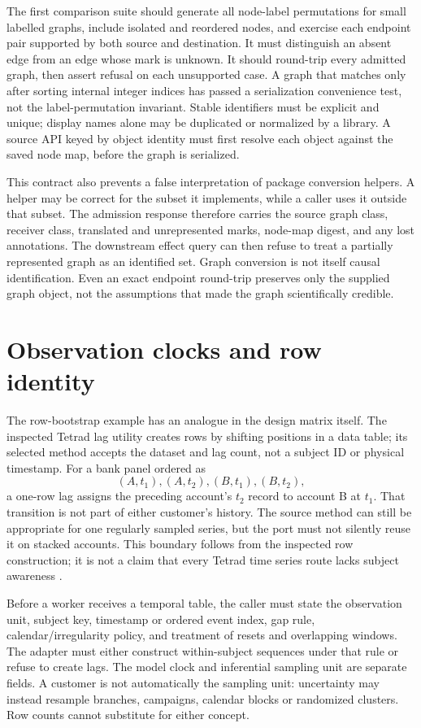 The first comparison suite should generate all node-label permutations for
small labelled graphs, include isolated and reordered nodes, and exercise each
endpoint pair supported by both source and destination. It must distinguish
an absent edge from an edge whose mark is unknown. It should round-trip every
admitted graph, then assert refusal on each unsupported case. A graph that
matches only after sorting internal integer indices has passed a serialization
convenience test, not the label-permutation invariant. Stable identifiers must
be explicit and unique; display names alone may be duplicated or normalized
by a library. A source API keyed by object identity must first resolve each
object against the saved node map, before the graph is serialized.

This contract also prevents a false interpretation of package conversion
helpers. A helper may be correct for the subset it implements, while a caller
uses it outside that subset. The admission response therefore carries the
source graph class, receiver class, translated and unrepresented marks,
node-map digest, and any lost annotations. The downstream effect query can
then refuse to treat a partially represented graph as an identified set.
Graph conversion is not itself causal identification. Even an exact endpoint
round-trip preserves only the supplied graph object, not the assumptions that
made the graph scientifically credible.

\section{Observation clocks and row identity}

The row-bootstrap example has an analogue in the design matrix itself. The
inspected Tetrad lag utility creates rows by shifting positions in a data table;
its selected method accepts the dataset and lag count, not a subject ID or
physical timestamp. For a bank panel ordered as
\[
  (A,t_1),(A,t_2),(B,t_1),(B,t_2),
\]
a one-row lag assigns the preceding account's $t_2$ record to account B at
$t_1$. That transition is not part of either customer's history. The source
method can still be appropriate for one regularly sampled series, but the
port must not silently reuse it on stacked accounts. This boundary follows
from the inspected row construction; it is not a claim that every Tetrad time
series route lacks subject awareness \citep{exec15_javatemporal_tetrad}.

Before a worker receives a temporal table, the caller must state the
observation unit, subject key, timestamp or ordered event index, gap rule,
calendar/irregularity policy, and treatment of resets and overlapping windows.
The adapter must either construct within-subject sequences under that rule or
refuse to create lags. The model clock and inferential sampling unit are
separate fields. A customer is not automatically the sampling unit: uncertainty
may instead resample branches, campaigns, calendar blocks or randomized
clusters. Row counts cannot substitute for either concept.

